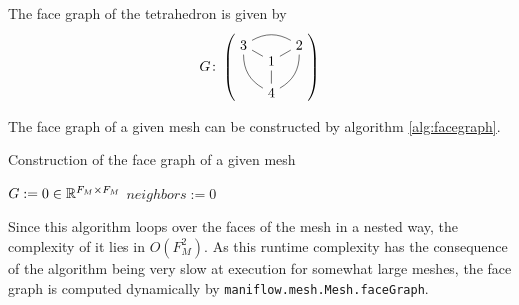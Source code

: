 \begin{ex} The face graph of the tetrahedron is given by
    \begin{equation}\label{eq:sample_g1}
    G\colon\left(\vcenter{\hbox{\begin{tikzpicture}[scale=0.8]
    \node (1) at (0,0) {$1$};
    \node (2) at (0.87,0.5) {$2$};
    \node (3) at (-0.87,0.5) {$3$};
    \node (4) at (0,-1) {$4$};
    \draw[-] (1) -- (2);
    \draw[-] (1) -- (3);
    \draw[-] (1) -- (4);
    \path[-] (2) edge[bend right=30] (3);
    \path[-] (3) edge[bend right=30] (4);
    \path[-] (4) edge[bend right=30] (2);
\end{tikzpicture}}}\right)
\end{equation}
\end{ex}
The face graph of a given mesh can be constructed by algorithm \ref{alg:facegraph}.
\begin{algorithm}

    \caption{Construction of the face graph of a given mesh}
    \label{alg:facegraph}
    $G := 0\in\mathbb{R}^{F_M\times F_M}$\;
    {
        $neighbors := 0$\;
        {
        }
    }
\end{algorithm}
Since this algorithm loops over the faces of the mesh in a nested way, the complexity of it lies in $O(F_M^2)$. As this runtime complexity has the consequence of the algorithm being very slow at execution for somewhat large meshes, the face graph is computed dynamically by \texttt{maniflow.mesh.Mesh.faceGraph}.
